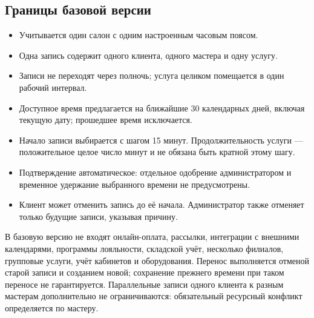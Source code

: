 \subsection{Границы базовой версии}
\begin{itemize}
\item Учитывается один салон с одним настроенным часовым поясом.
\item Одна запись содержит одного клиента, одного мастера и одну услугу.
\item Записи не переходят через полночь; услуга целиком помещается в один рабочий интервал.
\item Доступное время предлагается на ближайшие 30 календарных дней, включая текущую дату; прошедшее время исключается.
\item Начало записи выбирается с шагом 15 минут. Продолжительность услуги --- положительное целое число минут и не обязана быть кратной этому шагу.
\item Подтверждение автоматическое: отдельное одобрение администратором и временное удержание выбранного времени не предусмотрены.
\item Клиент может отменить запись до её начала. Администратор также отменяет только будущие записи, указывая причину.
\end{itemize}
В базовую версию не входят онлайн-оплата, рассылки, интеграции с внешними календарями, программы лояльности, складской учёт, несколько филиалов, групповые услуги, учёт кабинетов и оборудования. Перенос выполняется отменой старой записи и созданием новой; сохранение прежнего времени при таком переносе не гарантируется. Параллельные записи одного клиента к разным мастерам дополнительно не ограничиваются: обязательный ресурсный конфликт определяется по мастеру.

